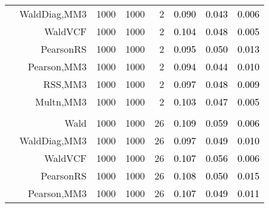 \documentclass[
]{article}
\begin{document}
\begin{table}[H]
{\begin{tabular}[t]{lrrrrrrr}
\hspace{1em} & WaldDiag,MM3 & 1000 & 1000 & 2 & \textcolor{black}{0.090} & \textcolor{black}{0.043} & \textcolor{black}{0.006}\\

\hspace{1em} & WaldVCF & 1000 & 1000 & 2 & \textcolor{black}{0.104} & \textcolor{black}{0.048} & \textcolor{black}{0.005}\\

\hspace{1em} & PearsonRS & 1000 & 1000 & 2 & \textcolor{black}{0.095} & \textcolor{black}{0.050} & \textcolor{black}{0.013}\\

\hspace{1em} & Pearson,MM3 & 1000 & 1000 & 2 & \textcolor{black}{0.094} & \textcolor{black}{0.044} & \textcolor{black}{0.010}\\

\hspace{1em} & RSS,MM3 & 1000 & 1000 & 2 & \textcolor{black}{0.097} & \textcolor{black}{0.048} & \textcolor{black}{0.009}\\

\hspace{1em} & Multn,MM3 & 1000 & 1000 & 2 & \textcolor{black}{0.103} & \textcolor{black}{0.047} & \textcolor{black}{0.005}\\
\cmidrule{1-8}
\addlinespace[0.3em]
\multicolumn{8}{l}{\textbf{1F 15V}}\\
\hspace{1em} & Wald & 1000 & 1000 & 26 & \textcolor{black}{0.109} & \textcolor{black}{0.059} & \textcolor{black}{0.006}\\

\hspace{1em} & WaldDiag,MM3 & 1000 & 1000 & 26 & \textcolor{black}{0.097} & \textcolor{black}{0.049} & \textcolor{black}{0.010}\\

\hspace{1em} & WaldVCF & 1000 & 1000 & 26 & \textcolor{black}{0.107} & \textcolor{black}{0.056} & \textcolor{black}{0.006}\\

\hspace{1em} & PearsonRS & 1000 & 1000 & 26 & \textcolor{black}{0.108} & \textcolor{black}{0.050} & \textcolor{black}{0.015}\\

\hspace{1em} & Pearson,MM3 & 1000 & 1000 & 26 & \textcolor{black}{0.107} & \textcolor{black}{0.049} & \textcolor{black}{0.011}\\


\end{tabular}}
\end{table}
\end{document}
